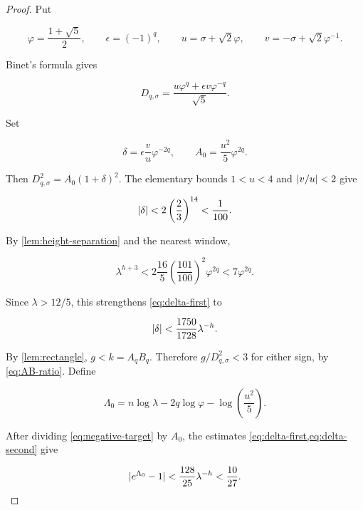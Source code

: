 \begin{proof}
Put

\begin{equation}
 \varphi=\frac{1+\sqrt5}{2},
 \qquad
 \epsilon=(-1)^q,
 \qquad
 u=\sigma+\sqrt2\varphi,
 \qquad
 v=-\sigma+\sqrt2\varphi^{-1}.
 \label{eq:u-v}
\end{equation}

Binet's formula gives

\begin{equation}
 D_{q,\sigma}
 =\frac{u\varphi^q+\epsilon v\varphi^{-q}}{\sqrt5}.
 \label{eq:D-binet}
\end{equation}

Set

\begin{equation}
 \delta=\epsilon\frac vu\varphi^{-2q},
 \qquad
 A_0=\frac{u^2}{5}\varphi^{2q}.
\end{equation}

Then $D_{q,\sigma}^2=A_0(1+\delta)^2$. The elementary bounds
$1<u<4$ and $\lvert v/u\rvert<2$ give

\begin{equation}
 \lvert\delta\rvert<2\left(\frac23\right)^{14}<\frac1{100}.
 \label{eq:delta-first}
\end{equation}

By \cref{lem:height-separation} and the nearest window,

\begin{equation}
 \lambda^{h+3}<2\frac{16}{5}\left(\frac{101}{100}\right)^2
 \varphi^{2q}<7\varphi^{2q}.
\end{equation}

Since $\lambda>12/5$, this strengthens \cref{eq:delta-first} to

\begin{equation}
 \lvert\delta\rvert<\frac{1750}{1728}\lambda^{-h}.
 \label{eq:delta-second}
\end{equation}

By \cref{lem:rectangle}, $g<k=A_qB_q$. Therefore
$g/D_{q,\sigma}^2<3$ for either sign, by \cref{eq:AB-ratio}. Define

\begin{equation}
 \Lambda_0=n\log\lambda-2q\log\varphi
 -\log\left(\frac{u^2}{5}\right).
 \label{eq:Lambda0}
\end{equation}

After dividing \cref{eq:negative-target} by $A_0$, the estimates
\cref{eq:delta-first,eq:delta-second} give

\begin{equation}
 \lvert e^{\Lambda_0}-1\rvert<\frac{128}{25}\lambda^{-h}<\frac{10}{27}.
\end{equation}


\end{proof}
